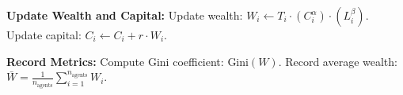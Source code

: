 \begin{algorithm}
\begin{algorithmic}[1]
    \State \textbf{Update Wealth and Capital:}
        \State Update wealth: $W_i \gets T_i \cdot (C_i^\alpha) \cdot (L_i^\beta)$.
        \State Update capital: $C_i \gets C_i + r \cdot W_i$.
    \EndFor

    \State \textbf{Record Metrics:}
    \State Compute Gini coefficient: $\text{Gini}(W)$.
    \State Record average wealth: $\bar{W} = \frac{1}{n_{\text{agents}}} \sum_{i=1}^{n_{\text{agents}}} W_i$.
\EndFor
\end{algorithmic}
\end{algorithm}